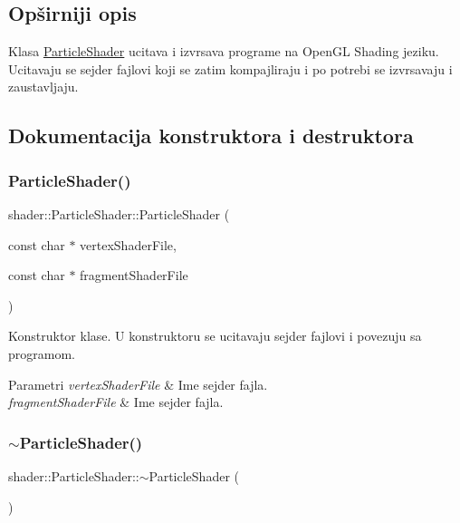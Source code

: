 \subsection{Opširniji opis}
Klasa \hyperlink{classshader_1_1ParticleShader}{Particle\+Shader} ucitava i izvrsava programe na Open\+GL Shading jeziku. Ucitavaju se sejder fajlovi koji se zatim kompajliraju i po potrebi se izvrsavaju i zaustavljaju. 

\subsection{Dokumentacija konstruktora i destruktora}
\mbox{\label{classshader_1_1ParticleShader_a6d6ce75a7f4712ca8da5213c2c4a97e0}} 
\subsubsection{\texorpdfstring{Particle\+Shader()}{ParticleShader()}}
{\footnotesize\ttfamily shader\+::\+Particle\+Shader\+::\+Particle\+Shader (\begin{DoxyParamCaption}\item[{const char $\ast$}]{vertex\+Shader\+File,  }\item[{const char $\ast$}]{fragment\+Shader\+File }\end{DoxyParamCaption})}



Konstruktor klase. U konstruktoru se ucitavaju sejder fajlovi i povezuju sa programom. 


\begin{DoxyParams}{Parametri}
{\em vertex\+Shader\+File} & Ime sejder fajla. \\
\hline
{\em fragment\+Shader\+File} & Ime sejder fajla. \\
\hline
\end{DoxyParams}
\mbox{\label{classshader_1_1ParticleShader_a7ca6c909aba78e143a999439382e80e9}} 
\subsubsection{\texorpdfstring{$\sim$\+Particle\+Shader()}{~ParticleShader()}}
{\footnotesize\ttfamily shader\+::\+Particle\+Shader\+::$\sim$\+Particle\+Shader (\begin{DoxyParamCaption}{ }\end{DoxyParamCaption})}



